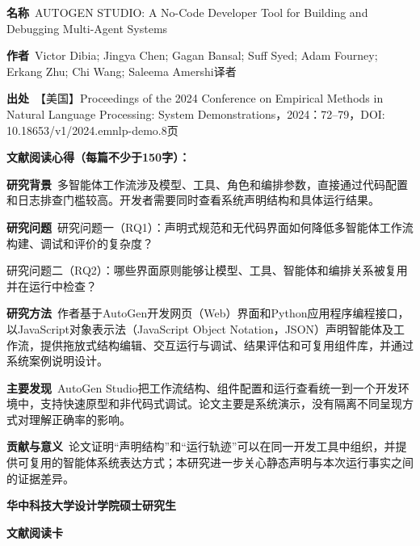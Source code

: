 \vspace{0.35em}
\noindent\textbf{名称}\ AUTOGEN STUDIO: A No-Code Developer Tool for Building and Debugging Multi-Agent Systems\par
\noindent\textbf{作者}\ Victor Dibia; Jingya Chen; Gagan Bansal; Suff Syed; Adam Fourney; Erkang Zhu; Chi Wang; Saleema Amershi\quad 译者\par
\noindent\textbf{出处}\ 【美国】Proceedings of the 2024 Conference on Empirical Methods in Natural Language Processing: System Demonstrations，2024：72–79，DOI: 10.18653/v1/2024.emnlp-demo.8\quad 页\par
\vspace{0.35em}
\noindent\textbf{文献阅读心得（每篇不少于150字）：}\par
\noindent\textbf{研究背景}\ 多智能体工作流涉及模型、工具、角色和编排参数，直接通过代码配置和日志排查门槛较高。开发者需要同时查看系统声明结构和具体运行结果。\par
\noindent\textbf{研究问题}\ 研究问题一（RQ1）：声明式规范和无代码界面如何降低多智能体工作流构建、调试和评价的复杂度？\par
研究问题二（RQ2）：哪些界面原则能够让模型、工具、智能体和编排关系被复用并在运行中检查？\par
\noindent\textbf{研究方法}\ 作者基于AutoGen开发网页（Web）界面和Python应用程序编程接口，以JavaScript对象表示法（JavaScript Object Notation，JSON）声明智能体及工作流，提供拖放式结构编辑、交互运行与调试、结果评估和可复用组件库，并通过系统案例说明设计。\par
\noindent\textbf{主要发现}\ AutoGen Studio把工作流结构、组件配置和运行查看统一到一个开发环境中，支持快速原型和非代码式调试。论文主要是系统演示，没有隔离不同呈现方式对理解正确率的影响。\par
\noindent\textbf{贡献与意义}\ 论文证明“声明结构”和“运行轨迹”可以在同一开发工具中组织，并提供可复用的智能体系统表达方式；本研究进一步关心静态声明与本次运行事实之间的证据差异。\par
\clearpage
\begin{center}
{\songti\bfseries\fontsize{18.5pt}{27.75pt}\selectfont 华中科技大学设计学院硕士研究生\par}
{\songti\bfseries\fontsize{18.5pt}{27.75pt}\selectfont 文献阅读卡\par}
\end{center}
\vspace{0.25em}
\noindent\underline{}\par
\vspace{0.35em}
